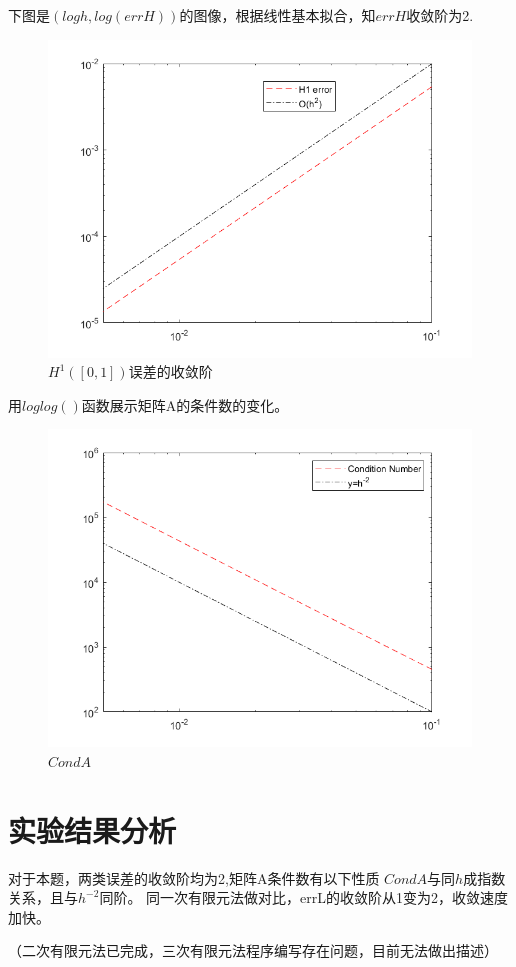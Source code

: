 \documentclass{article}
\begin{document}
下图是$(logh,log(errH))$的图像，根据线性基本拟合，知$errH$收敛阶为2.
\begin{figure}[H]
\centering
\includegraphics[scale=0.6]{H1_err.png}
\caption{\label{H1_err}$H^{1}([0,1])$误差的收敛阶}
\end{figure}



用$loglog()$函数展示矩阵A的条件数的变化。
\begin{figure}[H]
\centering
\includegraphics[scale=0.6]{CondA.png}
\caption{\label{CondA}$CondA$}
\end{figure}


\section{实验结果分析}
对于本题，两类误差的收敛阶均为2,矩阵A条件数有以下性质 $CondA$与同$h$成指数关系，且与$h^{-2}$同阶。
同一次有限元法做对比，errL的收敛阶从1变为2，收敛速度加快。

（二次有限元法已完成，三次有限元法程序编写存在问题，目前无法做出描述）
\end{document}
